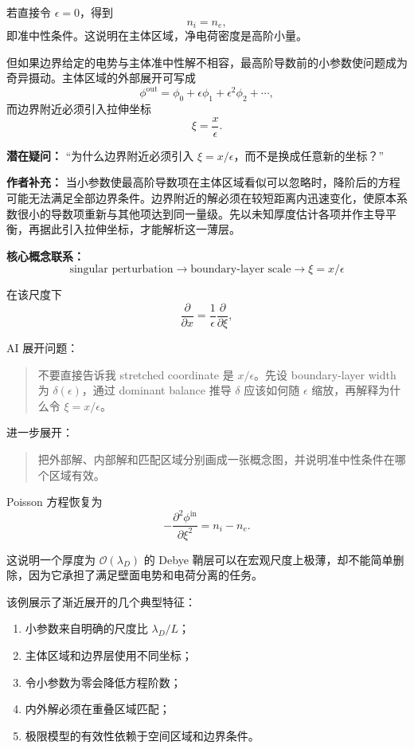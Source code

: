 \documentclass[11pt,openany]{ctexbook}
\newcommand{\Order}{\mathcal O}
\begin{document}
若直接令 \(\epsilon=0\)，得到
\[
n_i=n_e,
\]
即准中性条件。这说明在主体区域，净电荷密度是高阶小量。

但如果边界给定的电势与主体准中性解不相容，最高阶导数前的小参数使问题成为奇异摄动。主体区域的外部展开可写成
\[
\phi^{\mathrm{out}}
=
\phi_0+\epsilon\phi_1+\epsilon^2\phi_2+\cdots,
\]
而边界附近必须引入拉伸坐标
\[
\xi=\frac{x}{\epsilon}.
\]

\begin{authornote}
\textbf{潜在疑问：}
“为什么边界附近必须引入 \(\xi=x/\epsilon\)，而不是换成任意新的坐标？”

\textbf{作者补充：}
当小参数使最高阶导数项在主体区域看似可以忽略时，降阶后的方程可能无法满足全部边界条件。边界附近的解必须在较短距离内迅速变化，使原本系数很小的导数项重新与其他项达到同一量级。先以未知厚度估计各项并作主导平衡，再据此引入拉伸坐标，才能解析这一薄层。

\textbf{核心概念联系：}
\[
\text{singular perturbation}
\longrightarrow
\text{boundary-layer scale}
\longrightarrow
\xi=x/\epsilon
\]
\end{authornote}

在该尺度下
\[
\frac{\partial}{\partial x}
=
\frac{1}{\epsilon}\frac{\partial}{\partial\xi},
\]

\begin{askai}
AI 展开问题：
\begin{quote}
不要直接告诉我 stretched coordinate 是 \(x/\epsilon\)。先设 boundary-layer width 为 \(\delta(\epsilon)\)，通过 dominant balance 推导 \(\delta\) 应该如何随 \(\epsilon\) 缩放，再解释为什么令 \(\xi=x/\epsilon\)。
\end{quote}

进一步展开：
\begin{quote}
把外部解、内部解和匹配区域分别画成一张概念图，并说明准中性条件在哪个区域有效。
\end{quote}
\end{askai}

Poisson 方程恢复为
\[
-\frac{\partial^2\phi^{\mathrm{in}}}{\partial\xi^2}
=
n_i-n_e.
\]

这说明一个厚度为 \(\Order(\lambda_D)\) 的 Debye 鞘层可以在宏观尺度上极薄，却不能简单删除，因为它承担了满足壁面电势和电荷分离的任务。

该例展示了渐近展开的几个典型特征：
\begin{enumerate}
  \item 小参数来自明确的尺度比 \(\lambda_D/L\)；
  \item 主体区域和边界层使用不同坐标；
  \item 令小参数为零会降低方程阶数；
  \item 内外解必须在重叠区域匹配；
  \item 极限模型的有效性依赖于空间区域和边界条件。
\end{enumerate}
\end{document}
